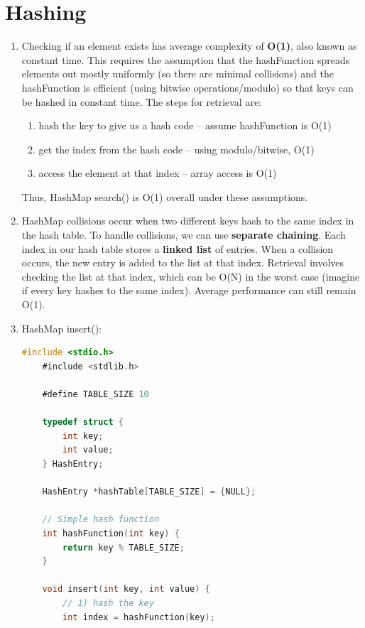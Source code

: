 \documentclass[12pt]{article}
\begin{document}
\section{Hashing}
\begin{enumerate}
    \item Checking if an element exists has average complexity of \textbf{O(1)}, also known as constant time. This requires the assumption that the hashFunction spreads elements out mostly uniformly (so there are minimal collisions) and the hashFunction is efficient (using bitwise operations/modulo) so that keys can be hashed in constant time. The steps for retrieval are:
    \begin{enumerate}
        \item hash the key to give us a hash code -- assume hashFunction is O(1)
        \item get the index from the hash code -- using modulo/bitwise, O(1)
        \item access the element at that index -- array access is O(1)
    \end{enumerate}
    Thus, HashMap search() is O(1) overall under these assumptions.

    \item HashMap collisions occur when two different keys hash to the same index in the hash table. To handle collisions, we can use \textbf{separate chaining}. Each index in our hash table stores a \textbf{linked list} of entries. When a collision occurs, the new entry is added to the list at that index. Retrieval involves checking the list at that index, which can be O(N) in the worst case (imagine if every key hashes to the same index). Average performance can still remain O(1).

    \item HashMap insert():
    \begin{lstlisting}[language=C]
    #include <stdio.h>
    #include <stdlib.h>
    
    #define TABLE_SIZE 10
    
    typedef struct {
        int key;
        int value;
    } HashEntry;
    
    HashEntry *hashTable[TABLE_SIZE] = {NULL};
    
    // Simple hash function
    int hashFunction(int key) {
        return key % TABLE_SIZE;
    }
    
    void insert(int key, int value) {
        // 1) hash the key
        int index = hashFunction(key);
    

\end{lstlisting}
\end{enumerate}
\end{document}
